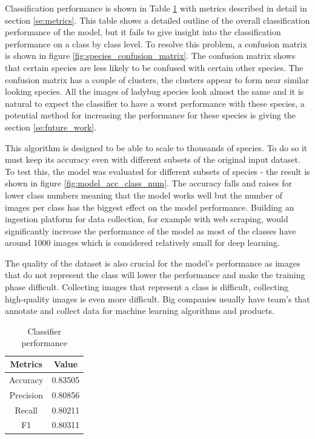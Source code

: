 \documentclass[times, utf8, diplomski]{fer}
\begin{document}
Classification performance is shown in Table \ref{tb:classifier_performance} with metrics described in detail in section \ref{se:metrics}. This table shows a detailed outline of the overall classification performance of the model, but it fails to give insight into the classification performance on a class by class level. To resolve this problem, a confusion matrix is shown in figure \ref{fig:species_confusion_matrix}. The confusion matrix shows that certain species are less likely to be confused with certain other species. The confusion matrix has a couple of clusters, the clusters appear to form near similar looking species. All the images of ladybug species look almost the same and it is natural to expect the classifier to have a worst performance with these species, a potential method for increasing the performance for these species is giving the section \ref{se:future_work}.

This algorithm is designed to be able to scale to thousands of species. To do so it must keep its accuracy even with different subsets of the original input dataset. To test this, the model was evaluated for different subsets of species - the result is shown in figure \ref{fig:model_acc_class_num}. The accuracy falls and raises for lower class numbers meaning that the model works well but the number of images per class has the biggest effect on the model performance. Building an ingestion platform for data collection, for example with web scraping, would significantly increase the performance of the model as most of the classes have around 1000 images which is considered relatively small for deep learning. 

The quality of the dataset is also crucial for the model's performance as images that do not represent the class will lower the performance and make the training phase difficult. Collecting images that represent a class is difficult, collecting high-quality images is even more difficult. Big companies usually have team's that annotate and collect data for machine learning algorithms and products.

\begin{table}
\centering
\caption{Classifier performance}
\label{tb:classifier_performance}
\begin{tabular}{cc}
\hline 
Metrics & Value \\ \hline 
Accuracy &  0.83505\\ 
Precision & 0.80856 \\ 
Recall & 0.80211 \\
F1 & 0.80311 \\
\hline 
\end{tabular} 
\end{table}
\end{document}
